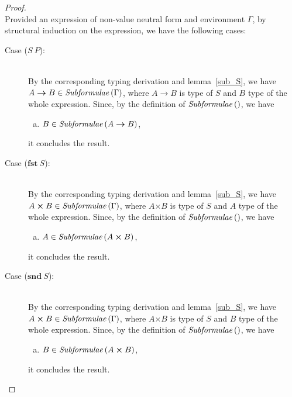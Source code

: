 \documentclass[11p,a4paper]{article}
\newcommand{\typarr}[2]{#1\boldsymbol{\rightarrow}#2}
\newcommand{\typprd}[2]{#1\boldsymbol{\times}#2}
\newcommand{\expapp}[2]{#1\ #2}
\newcommand{\expfst}[1]{\mathbf{fst}\ #1}
\newcommand{\expsnd}[1]{\mathbf{snd}\ #1}
\newcommand{\txt}[1]{\text{\textit{#1}}}
\newcommand{\subformulae}[1]{\txt{Subformulae}\,(#1)}
\begin{document}
\begin{proof}\ \\
Provided an expression of non-value neutral form and environment
$\Gamma$, by structural induction on the expression, we have the following cases:
\begin{description}
\item[Case ($\expapp{S}{P}$):]\ \\ 
  By the corresponding typing derivation and lemma~\ref{sub_S}, we
  have $\typarr{A}{B} \in \subformulae{\Gamma}$, where $\typarr{A}{B}$
  is type of $S$ and $B$ type of the whole expression. Since, by the
  definition of $\subformulae{}$, we have
  \begin{enumerate}[(a)] 
  \item  $B \in \subformulae{\typarr{A}{B}}$,
  \end{enumerate}
  it concludes the result.
\item[Case ($\expfst{S}$):]\ \\
  By the corresponding typing derivation and lemma~\ref{sub_S}, we
  have $\typprd{A}{B} \in \subformulae{\Gamma}$, where $\typprd{A}{B}$
  is type of $S$ and $A$ type of the whole expression. Since, by the
  definition of $\subformulae{}$, we have
  \begin{enumerate}[(a)] 
  \item $A \in \subformulae{\typprd{A}{B}}$,
  \end{enumerate}
  it concludes the result.
\item[Case ($\expsnd{S}$):]\ \\
  By the corresponding typing derivation and lemma~\ref{sub_S}, we
  have $\typprd{A}{B} \in \subformulae{\Gamma}$, where $\typprd{A}{B}$
  is type of $S$ and $B$ type of the whole expression. Since, by the
  definition of $\subformulae{}$, we have
  \begin{enumerate}[(a)] 
  \item $B \in \subformulae{\typprd{A}{B}}$,
  \end{enumerate}
  it concludes the result.
\end{description}
\end{proof}
\end{document}

